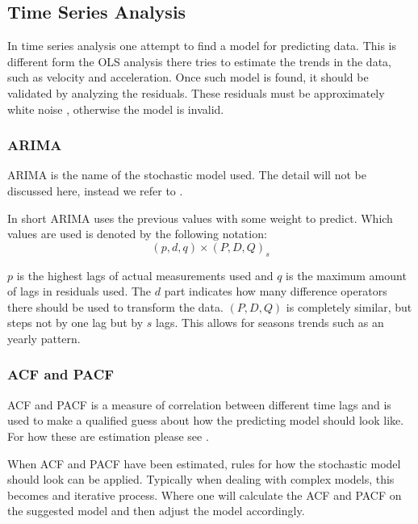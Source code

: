 \subsection{Time Series Analysis}

In time series analysis one attempt to find a model for predicting data. This is different form the OLS analysis there tries to estimate the trends in the data, such as velocity and acceleration. Once such model is found, it should be validated by analyzing the residuals. These residuals must be approximately white noise \cite[p.~130]{time-series-analysis}, otherwise the model is invalid. 

\subsubsection{ARIMA}

ARIMA is the name of the stochastic model used. The detail will not be discussed here, instead we refer to \cite[p.~130]{time-series-analysis}.

In short ARIMA uses the previous values with some weight to predict. Which values are used is denoted by the following notation:
\begin{equation}
(p, d, q) \times (P, D, Q)_s
\end{equation}

$p$ is the highest lags of actual measurements used and $q$ is the maximum amount of lags in residuals used. The $d$ part indicates how many difference operators there should be used to transform the data. $(P, D, Q)$ is completely similar, but steps not by one lag but by $s$ lags. This allows for seasons trends such as an yearly pattern.

\subsubsection{ACF and PACF}
 
ACF and PACF is a measure of correlation between different time lags and is used to make a qualified guess about how the predicting model should look like. 
For how these are estimation please see \cite[p.~146]{time-series-analysis}.

When ACF and PACF have been estimated, rules \cite[table~6.1]{time-series-analysis} for how the stochastic model should look can be applied.
Typically when dealing with complex models, this becomes and iterative process.
Where one will calculate the ACF and PACF on the suggested model and then adjust the model accordingly.

